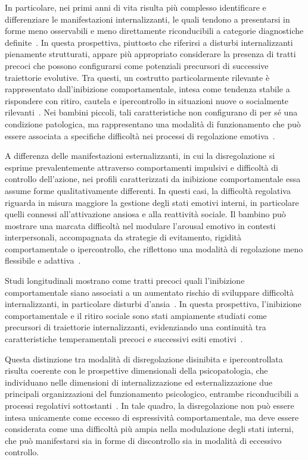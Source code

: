             In particolare, nei primi anni di vita risulta più complesso identificare e differenziare le manifestazioni internalizzanti, le quali tendono a presentarsi in forme meno osservabili e meno direttamente riconducibili a categorie diagnostiche definite~\cite{egger2006}. In questa prospettiva, piuttosto che riferirsi a disturbi internalizzanti pienamente strutturati, appare più appropriato considerare la presenza di tratti precoci che possono configurarsi come potenziali precursori di successive traiettorie evolutive. Tra questi, un costrutto particolarmente rilevante è rappresentato dall'inibizione comportamentale, intesa come tendenza stabile a rispondere con ritiro, cautela e ipercontrollo in situazioni nuove o socialmente rilevanti~\cite{kagan1987,fox2005}. Nei bambini piccoli, tali caratteristiche non configurano di per sé una condizione patologica, ma rappresentano una modalità di funzionamento che può essere associata a specifiche difficoltà nei processi di regolazione emotiva~\cite{degnan2007}.

            A differenza delle manifestazioni esternalizzanti, in cui la disregolazione si esprime prevalentemente attraverso comportamenti impulsivi e difficoltà di controllo dell'azione, nei profili caratterizzati da inibizione comportamentale essa assume forme qualitativamente differenti. In questi casi, la difficoltà regolativa riguarda in misura maggiore la gestione degli stati emotivi interni, in particolare quelli connessi all'attivazione ansiosa e alla reattività sociale. Il bambino può mostrare una marcata difficoltà nel modulare l'arousal emotivo in contesti interpersonali, accompagnata da strategie di evitamento, rigidità comportamentale o ipercontrollo, che riflettono una modalità di regolazione meno flessibile e adattiva~\cite{rubin2009}.

            Studi longitudinali mostrano come tratti precoci quali l'inibizione comportamentale siano associati a un aumentato rischio di sviluppare difficoltà internalizzanti, in particolare disturbi d'ansia~\cite{kagan1987,fox2005,chronistuscano2009}. In questa prospettiva, l'inibizione comportamentale e il ritiro sociale sono stati ampiamente studiati come precursori di traiettorie internalizzanti, evidenziando una continuità tra caratteristiche temperamentali precoci e successivi esiti emotivi~\cite{degnan2007,rubin2009}.

            Questa distinzione tra modalità di disregolazione disinibita e ipercontrollata risulta coerente con le prospettive dimensionali della psicopatologia, che individuano nelle dimensioni di internalizzazione ed esternalizzazione due principali organizzazioni del funzionamento psicologico, entrambe riconducibili a processi regolativi sottostanti~\cite{zelazo2020}. In tale quadro, la disregolazione non può essere intesa unicamente come eccesso di espressività comportamentale, ma deve essere considerata come una difficoltà più ampia nella modulazione degli stati interni, che può manifestarsi sia in forme di discontrollo sia in modalità di eccessivo controllo.

